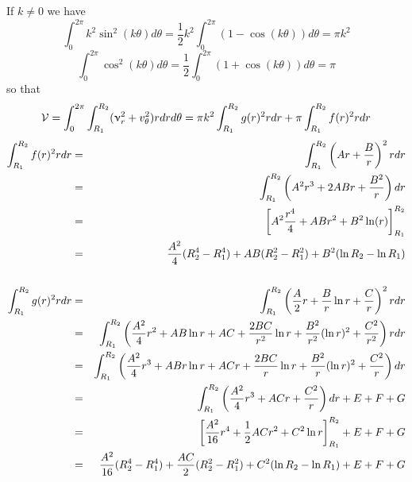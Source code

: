 \begin{itemize}
If $k\neq 0$ we have
\[
\int_0^{2\pi} k^2  \sin^2(k\theta) d\theta = \frac{1}{2}k^2 \int_0^{2\pi} (1-\cos(k \theta)) d\theta  = \pi k^2
\]
\[
\int_0^{2\pi}   \cos^2(k\theta) d\theta = \frac{1}{2} \int_0^{2\pi} (1+\cos(k \theta)) d\theta  = \pi 
\]
so that 
\[
{\cal V}=\int_0^{2\pi}\int_{R_1}^{R_2} (\upnu_r^2 + v_\theta^2) r dr d\theta =  \pi k^2 \int_{R_1}^{R_2} g(r)^2 r dr + \pi  \int_{R_1}^{R_2} f(r)^2 r dr
\]
\begin{eqnarray}
\int_{R_1}^{R_2} f(r)^2 r dr 
&=&  \int_{R_1}^{R_2} \left( Ar + \frac{B}{r} \right)^2 r dr  \nonumber\\
&=&  \int_{R_1}^{R_2} \left( A^2r^3 + 2ABr + \frac{B^2}{r}  \right) dr  \nonumber\\
&=& \left[ A^2 \frac{r^4}{4} + ABr^2 + B^2 \ln(r)  \right]_{R_1}^{R_2}  \nonumber\\
&=& \frac{A^2}{4}(R_2^4-R_1^4) + AB (R_2^2-R_1^2) + B^2 (\ln R_2 - \ln R_1)
\nonumber\\
\nonumber\\
\int_{R_1}^{R_2} g(r)^2 r dr
&=&  \int_{R_1}^{R_2} \left(  \frac{A}{2}r  +  \frac{B}{r} \ln r + \frac{C}{r} \right)^2 r dr  \nonumber\\
&=&  \int_{R_1}^{R_2} \left(  \frac{A^2}{4}r^2  +  AB \ln r + AC + \frac{2BC}{r^2} \ln r + \frac{B^2}{r^2}(\ln r)^2 + \frac{C^2}{r^2}\right) r dr  \nonumber\\
&=&  \int_{R_1}^{R_2} \left(  \frac{A^2}{4}r^3  +  AB r \ln r + AC r  + \frac{2BC}{r} \ln r + \frac{B^2}{r}(\ln r)^2 + \frac{C^2}{r}\right)  dr  \nonumber\\
&=&  \int_{R_1}^{R_2} \left(  \frac{A^2}{4}r^3  + AC r  + \frac{C^2}{r}\right)  dr  + E + F + G\nonumber\\
&=&  \left[  \frac{A^2}{16}r^4  + \frac{1}{2}AC r^2  + C^2 \ln r \right]_{R_1}^{R_2}    + E + F + G\nonumber\\
&=&   \frac{A^2}{16} (R_2^4-R_1^4) + \frac{AC}{2} (R_2^2-R_1^2) + C^2 (\ln R_2 - \ln R_1 ) +  E + F + G\nonumber\\
\end{eqnarray}


\end{itemize}
